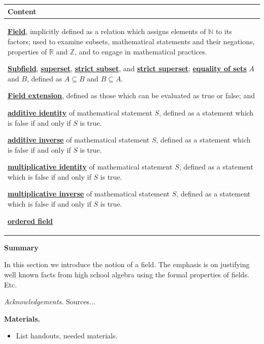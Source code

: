 \documentclass[11pt]{article}
\newcommand\header[1]{\vspace*{4pt}\par {\large {\bf #1}}\par}
\newenvironment{bignote}[1][Instructor note]%
	{\begin{mdframed}\raggedright{\bf #1.~}}
	{\end{mdframed}}
\newcommand{\R}{\mathbb{R}}
\newcommand{\N}{\mathbb{N}}
\newcommand{\Z}{\mathbb{Z}}
\renewcommand\subset\subseteq
\renewcommand\emph[1]{\underline{\bf{#1}}} %
\theoremstyle{definition}
\begin{document}
 \vspace*{-16pt}
\begin{tabular}{L{6.5in}} 
{\bf Content} \\ \hline \parskip4pt
\emph{Field}, implicitly defined as a relation which assigns elements of $\N$ to its factors; used to examine subsets, mathematical statements and their negations, properties of $\R$ and $\Z$, and to engage in mathematical practices. 

\emph{Subfield}, \emph{superset}, \emph{strict subset}, and \emph{strict superset}; \emph{equality of sets} $A$ and $B$, defined as $A\subset B$ and $B\subset A$.

\emph{Field extension}, defined as those which can be evaluated as true or false; and 

\emph{additive identity} of mathematical statement $S$, defined as a statement which is false if and only if $S$ is true.

\emph{additive inverse} of mathematical statement $S$, defined as a statement which is false if and only if $S$ is true.

\emph{multiplicative identity} of mathematical statement $S$, defined as a statement which is false if and only if $S$ is true.

\emph{multiplicative inverse} of mathematical statement $S$, defined as a statement which is false if and only if $S$ is true.

\emph{ordered field}

\end{tabular}

\header{Summary}

In this section we introduce the notion of a field. The emphasis is on justifying well known facts from high school algebra using the formal properties of
fields. Etc.
 

{\it Acknowledgements.} Sources...

\newpage
\begin{bignote}[Materials]
\begin{itemize}
  \item List handouts, needed materials.
\end{itemize}
\end{bignote}
\end{document}

